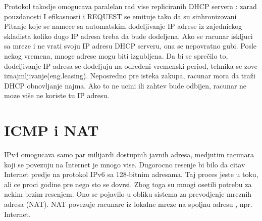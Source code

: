 \documentclass{article} %
\begin{document}
Protokol takodje omogucava paralelan rad vise repliciranih DHCP servera :
zarad pouzdanosti I efikasnosti i REQUEST se emituje tako da su sinhronizovani\\
Pitanje koje se namece sa automatskim dodeljivanje IP adrese iz zajednickog skladista koliko dugo IP adresa treba da bude dodeljena. Ako se racunar iskljuci sa  mreze i ne vrati svoju IP adresu DHCP serveru, ona se nepovratno gubi. Posle nekog vremena, mnoge adrese mogu biti izgubljena. Da bi se  sprečilo to, dodeljivanje IP adresa se dodeljuju na određeni vremenski period, tehnika se zove iznajmljivanje(eng.leasing). Neposredno pre isteka zakupa, racunar mora da traži DHCP obnovljanje najma. Ako to ne ucini ili zahtev bude odbijen, racunar ne  moze  više ne koriste tu IP adresu.
\section{ICMP i NAT}
IPv4 omogucava samo par milijardi dostupnih javnih adresa, medjutim racunara koji se povezuju na Internet je mnogo vise. Dugorocno resenje bi bilo da citav Internet predje na protokol IPv6 sa 128-bitnim adresama. Taj proces jeste u toku, ali ce proci godine pre nego sto se dovrsi. Zbog toga su mnogi osetili potrebu za nekim brzim resenjem. Ono se pojavilo u obliku sistema za prevodjenje mreznih adresa (NAT). NAT povezuje racunare iz lokalne mreze na spoljnu adresu , npr. Internet.\\
\end{document}
